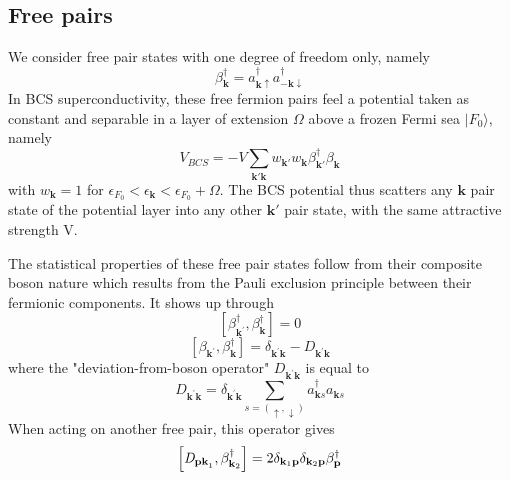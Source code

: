 \documentclass[aps,prb,preprint,groupedaddress,amsmath]{revtex4-1}
\newcommand{\vp}{\ensuremath{\mathbf{p}}}
\newcommand{\vk}{\ensuremath{\mathbf{k}}}
\newcommand{\dg}{\ensuremath{\dagger}}
\begin{document}
\subsection{Free pairs}
We consider free pair states with one degree of freedom only, namely
\begin{equation}\label{eq:beta}
\beta_\vk^\dg=a^\dg_{\vk\uparrow}{}a^\dg_{-\vk\downarrow}
\end{equation}
 In BCS superconductivity, these free fermion pairs feel a potential taken as constant and separable in a layer of extension $\Omega$ above a frozen Fermi sea $|F_0{\rangle}$, namely
\begin{equation}
V_{BCS}=-V\sum_{\vk'\vk}w_{\vk'}w_{\vk}\beta^\dg_{\vk'}\beta^{}_\vk
\label{eq:}
\end{equation}
with $w_\vk=1$ for $\epsilon_{F_0}<\epsilon_\vk<\epsilon_{F_0}+\Omega$. The BCS potential thus scatters any $\vk$ pair state of the potential layer into any other $\vk'$ pair state, with the same attractive strength V.

The statistical properties of these free pair states follow from their composite boson nature which results from the Pauli exclusion principle between their fermionic components. It shows up through
\begin{equation}  
\left[\beta^{\dagger}_{\mathbf{k} ^{\prime}},\beta^{\dagger}_{\mathbf{k} }%
\right]  =0
\end{equation}
\begin{equation}  \label{eq:betacom}
\left[\beta_{\mathbf{k} ^{\prime}},\beta^{\dagger}_{\mathbf{k} }\right] 
=\delta_{\mathbf{k} ^{\prime}\mathbf{k} }-\mathit{D} _{\mathbf{k} ^{\prime}%
\mathbf{k} }
\end{equation}
where the "deviation-from-boson operator" $\mathit{D} _{\mathbf{k} ^{\prime}\mathbf{k} }$ is equal to
\begin{equation}\label{eq:D}
\mathit{D} _{\mathbf{k} ^{\prime}\mathbf{k} }=\delta_{\mathbf{k} ^{\prime}\mathbf{k}}\sum_{s=(\uparrow,\downarrow)}a^\dg_{\vk{s}}{}a^{}_{\vk{s}}
\end{equation}
 When acting on another free pair, this operator gives
\begin{equation}
\left[\mathit{D} _{\mathbf{p}\mathbf{k} ^{}_1},\beta^{\dagger}_{%
\mathbf{k} _2}\right]  =2\delta_{\mathbf{k}_1 \mathbf{p} }\delta_{\mathbf{k}_2 \mathbf{p} }\beta_\vp^\dg
\end{equation}
\end{document}
